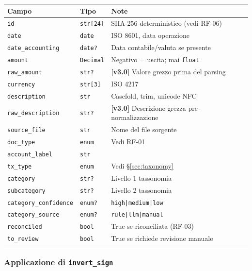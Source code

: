 \documentclass[11pt, a4paper]{article}
\begin{document}
\begin{center}
\begin{tabular}{@{}L{3.5cm} L{3.5cm} L{5.5cm}@{}}
\toprule
\textbf{Campo} & \textbf{Tipo} & \textbf{Note} \\
\midrule
\texttt{id}             & \texttt{str[24]}   & SHA-256 deterministico (vedi RF-06) \\
\texttt{date}           & \texttt{date}      & ISO 8601, data operazione \\
\texttt{date\_accounting} & \texttt{date?}   & Data contabile/valuta se presente \\
\texttt{amount}         & \texttt{Decimal}   & Negativo = uscita; mai \texttt{float} \\
\texttt{raw\_amount}    & \texttt{str?}      & \textbf{[v3.0]} Valore grezzo prima del parsing \\
\texttt{currency}       & \texttt{str[3]}    & ISO 4217 \\
\texttt{description}    & \texttt{str}       & Casefold, trim, unicode NFC \\
\texttt{raw\_description} & \texttt{str?}    & \textbf{[v3.0]} Descrizione grezza pre-normalizzazione \\
\texttt{source\_file}   & \texttt{str}       & Nome del file sorgente \\
\texttt{doc\_type}      & \texttt{enum}      & Vedi RF-01 \\
\texttt{account\_label} & \texttt{str}       & \\
\texttt{tx\_type}       & \texttt{enum}      & Vedi §\ref{sec:taxonomy} \\
\texttt{category}       & \texttt{str?}      & Livello 1 tassonomia \\
\texttt{subcategory}    & \texttt{str?}      & Livello 2 tassonomia \\
\texttt{category\_confidence} & \texttt{enum?} & \texttt{high|medium|low} \\
\texttt{category\_source} & \texttt{enum?}  & \texttt{rule|llm|manual} \\
\texttt{reconciled}     & \texttt{bool}      & True se riconciliata (RF-03) \\
\texttt{to\_review}     & \texttt{bool}      & True se richiede revisione manuale \\
\bottomrule
\end{tabular}
\end{center}

\subsubsection{Applicazione di \texttt{invert\_sign}}
\end{document}
